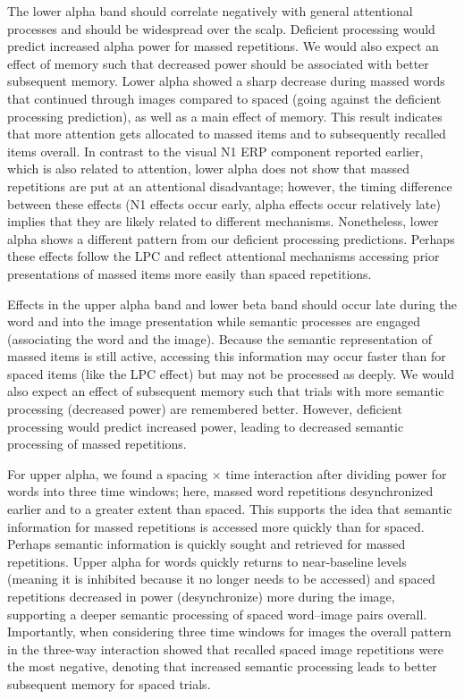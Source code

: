 The lower alpha band should correlate negatively with general attentional processes and should be widespread over the scalp.  Deficient processing would predict increased alpha power for massed repetitions.  We would also expect an effect of memory such that decreased power should be associated with better subsequent memory.
Lower alpha showed a sharp decrease during massed words that continued through images compared to spaced (going against the deficient processing prediction), as well as a main effect of memory.  This result indicates that more attention gets allocated to massed items and to subsequently recalled items overall.  In contrast to the visual N1 ERP component reported earlier, which is also related to attention, lower alpha does not show that massed repetitions are put at an attentional disadvantage; however, the timing difference between these effects (N1 effects occur early, alpha effects occur relatively late) implies that they are likely related to different mechanisms.
Nonetheless, lower alpha shows a different pattern from our deficient processing predictions.
Perhaps these effects follow the LPC and reflect attentional mechanisms accessing prior presentations of massed items more easily than spaced repetitions.

Effects in the upper alpha band and lower beta band should occur late during the word and into the image presentation while semantic processes are engaged (associating the word and the image).  Because the semantic representation of massed items is still active, accessing this information may occur faster than for spaced items (like the LPC effect) but may not be processed as deeply.  We would also expect an effect of subsequent memory such that trials with more semantic processing (decreased power) are remembered better.  However, deficient processing would predict increased power, leading to decreased semantic processing of massed repetitions.

For upper alpha, we found a spacing $\times$ time interaction after dividing power for words into three time windows; here, massed word repetitions desynchronized earlier and to a greater extent than spaced. This supports the idea that semantic information for massed repetitions is accessed more quickly than for spaced.  Perhaps semantic information is quickly sought and retrieved for massed repetitions.  Upper alpha for words quickly returns to near-baseline levels (meaning it is inhibited because it no longer needs to be accessed) and spaced repetitions decreased in power (desynchronize) more during the image, supporting a deeper semantic processing of spaced word--image pairs overall.  Importantly, when considering three time windows for images the overall pattern in the three-way interaction showed that recalled spaced image repetitions were the most negative, denoting that increased semantic processing leads to better subsequent memory for spaced trials.

